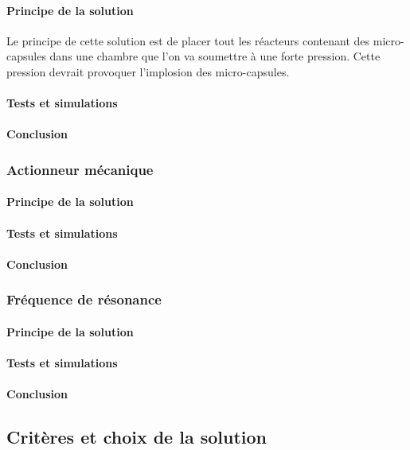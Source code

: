 \paragraph{Principe de la solution}
Le principe de cette solution est de placer tout les réacteurs contenant des micro-capsules dans une chambre que
l'on va soumettre à une forte pression. Cette pression devrait provoquer l'implosion des micro-capsules.

\paragraph{Tests et simulations}

\paragraph{Conclusion}


\subsubsection{Actionneur mécanique}
\paragraph{Principe de la solution}

\paragraph{Tests et simulations}

\paragraph{Conclusion}

\subsubsection{Fréquence de résonance}
\paragraph{Principe de la solution}

\paragraph{Tests et simulations}

\paragraph{Conclusion}


\subsection{Critères et choix de la solution}
